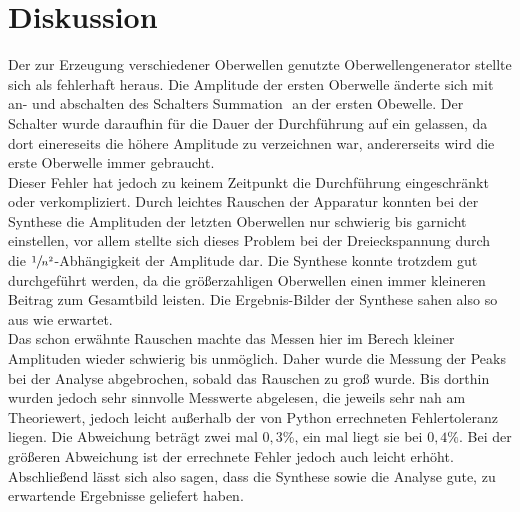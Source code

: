 \section{Diskussion}
\label{sec:Diskussion}
Der zur Erzeugung verschiedener Oberwellen genutzte Oberwellengenerator stellte sich als fehlerhaft heraus.
Die Amplitude der ersten Oberwelle änderte sich mit an- und abschalten des Schalters \glqq Summation\grqq\,\, an der ersten Obewelle.
Der Schalter wurde daraufhin für die Dauer der Durchführung auf \glqq ein\grqq \,\,gelassen, da dort einereseits die höhere Amplitude
zu verzeichnen war, andererseits wird die erste Oberwelle immer gebraucht.\\  \noindent
Dieser Fehler hat jedoch zu keinem Zeitpunkt die Durchführung eingeschränkt oder verkompliziert. Durch leichtes Rauschen 
der Apparatur konnten bei der Synthese die Amplituden der letzten Oberwellen nur schwierig bis garnicht einstellen, vor allem
stellte sich dieses Problem bei der Dreieckspannung durch die $\sfrac{1}{n^2}$-Abhängigkeit der Amplitude dar. Die Synthese konnte 
trotzdem gut durchgeführt werden, da die größerzahligen Oberwellen einen immer kleineren Beitrag zum Gesamtbild leisten. Die Ergebnis-Bilder
der Synthese sahen also so aus wie erwartet. \\ \noindent
Das schon erwähnte Rauschen machte das Messen hier im Berech kleiner Amplituden wieder schwierig bis unmöglich. Daher wurde die Messung der Peaks
bei der Analyse abgebrochen, sobald das Rauschen zu groß wurde. Bis dorthin wurden jedoch sehr sinnvolle Messwerte abgelesen, die jeweils
sehr nah am Theoriewert, jedoch leicht außerhalb der von Python errechneten Fehlertoleranz liegen. Die Abweichung beträgt zwei mal 
$0,3\%$, ein mal liegt sie bei $0,4\%$. Bei der größeren Abweichung ist der errechnete Fehler jedoch auch leicht erhöht. Abschließend lässt sich also
sagen, dass die Synthese sowie die Analyse gute, zu erwartende Ergebnisse geliefert haben.


